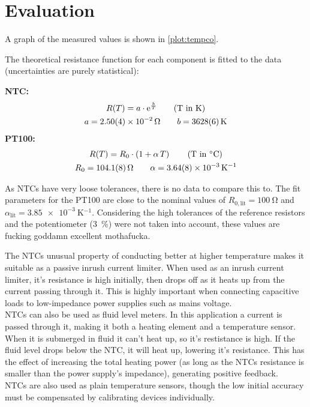 \section{Evaluation}

A graph of the measured values is shown in \autoref{plot:tempco}.

The theoretical resistance function for each component is fitted to the data (uncertainties are purely statistical):

\textbf{NTC:}
\begin{gather*}
	R(T) = a \cdot \mathrm{e}^{\frac{b}{T}} \tag*{(T in \si{\kelvin})}\\
	a = \SI{2.50(4)e-2}{\ohm}	\qquad	b = \SI{3628(6)}{\kelvin}
\end{gather*}
\textbf{PT100:}
\begin{gather*}
	R(T) = R_0 \cdot \left(1 + \alpha \, T \right) \tag*{(T in \si{\celsius})}\\
	R_0 = \SI{104.1(8)}{\ohm}	\qquad	\alpha = \SI{3.64(8)e-3}{\kelvin^{-1}}
\end{gather*}

As NTCs have very loose tolerances, there is no data to compare this to.
The fit parameters for the PT100 are close to the nominal values of $R_{0,\text{lit}} = \SI{100}{\ohm}$ and $\alpha_\text{lit} = \SI{3.85e-3}{\kelvin^{-1}}$.
Considering the high tolerances of the reference resistors and the potentiometer (\SI{3}{\percent}) were not taken into account, these values are fucking goddamn excellent mothafucka. 

The NTCs unusual property of conducting better at higher temperature makes it suitable as a passive inrush current limiter.
When used as an inrush current limiter, it's resistance is high initially, then drops off as it heats up from the current passing through it.
This is highly important when connecting capacitive loads to low-impedance power supplies such as mains voltage.\\
NTCs can also be used as fluid level meters.
In this application a current is passed through it, making it both a heating element and a temperature sensor.
When it is submerged in fluid it can't heat up, so it's restistance is high.
If the fluid level drops below the NTC, it will heat up, lowering it's resistance.
This has the effect of increasing the total heating power (as long as the NTCs resistance is smaller than the power supply's impedance), generating positive feedback.\\
NTCs are also used as plain temperature sensors, though the low initial accuracy must be compensated by calibrating devices individually.
